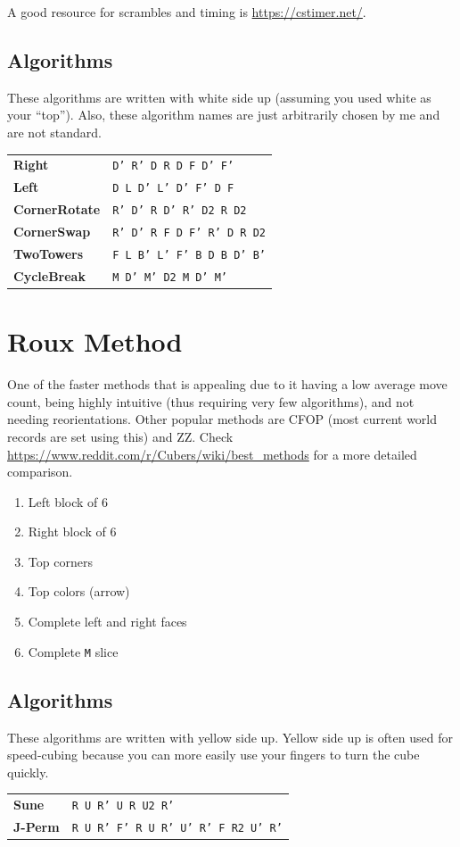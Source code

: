 \documentclass[10pt,landscape]{cheatsheet}
\newcommand{\mitem}[2]{\textbf{#1} & \texttt{#2} \\}
\begin{document}
\begin{multicols}{3}
A good resource for scrambles and timing is \url{https://cstimer.net/}.

\subsection{Algorithms}

These algorithms are written with white side up (assuming you used white as your ``top'').
Also, these algorithm names are just arbitrarily chosen by me and are not standard.

\begin{tabular}{ll}
    \toprule
    \mitem{Right}{D' R' D R D F D' F'}
    \mitem{Left}{D L D' L' D' F' D F}
    \midrule
    \mitem{CornerRotate}{R' D' R D' R' D2 R D2}
    \mitem{CornerSwap}{R' D' R F D F' R' D R D2}
    \mitem{TwoTowers}{F L B' L' F' B D B D' B'}
    \mitem{CycleBreak}{M D' M' D2 M D' M'}
    \bottomrule
\end{tabular}

\vfill

\section{Roux Method}

One of the faster methods that is appealing due to it having a low average move count, being highly intuitive (thus requiring very few algorithms), and not needing reorientations.
Other popular methods are CFOP (most current world records are set using this) and ZZ.
Check \url{https://www.reddit.com/r/Cubers/wiki/best_methods} for a more detailed comparison.

\begin{enumerate}
    \item Left block of 6
    \item Right block of 6
    \item Top corners
    \item Top colors (arrow)
    \item Complete left and right faces
    \item Complete \texttt{M} slice
\end{enumerate}

\subsection{Algorithms}

These algorithms are written with yellow side up.
Yellow side up is often used for speed-cubing because you can more easily use your fingers to turn the cube quickly.

\begin{tabular}{ll}
    \toprule
    \mitem{Sune}{R U R' U R U2 R'}
    \mitem{J-Perm}{R U R' F' R U R' U' R' F R2 U' R'}
    \bottomrule
\end{tabular}

\end{multicols}
\end{document}
